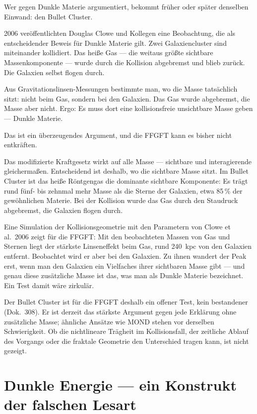 \documentclass[11pt,oneside]{book}
\begin{document}
Wer gegen Dunkle Materie argumentiert, bekommt früher oder
später denselben Einwand: den Bullet Cluster.

2006 veröffentlichten Douglas Clowe und Kollegen eine
Beobachtung, die als entscheidender Beweis für Dunkle Materie
gilt. Zwei Galaxiencluster sind miteinander kollidiert. Das
heiße Gas — die weitaus größte sichtbare Massenkomponente —
wurde durch die Kollision abgebremst und blieb zurück. Die
Galaxien selbst flogen durch.

Aus Gravitationslinsen-Messungen bestimmte man, wo die
Masse tatsächlich sitzt: nicht beim Gas, sondern bei den
Galaxien. Das Gas wurde abgebremst, die Masse aber nicht.
Ergo: Es muss dort eine kollisionsfreie unsichtbare Masse
geben — Dunkle Materie.

Das ist ein überzeugendes Argument, und die FFGFT kann es
bisher nicht entkräften.

Das modifizierte Kraftgesetz wirkt auf alle Masse — sichtbare
und interagierende gleichermaßen. Entscheidend ist deshalb, wo
die sichtbare Masse sitzt. Im Bullet Cluster ist das heiße
Röntgengas die dominante sichtbare Komponente: Es trägt rund
fünf- bis zehnmal mehr Masse als die Sterne der Galaxien, etwa
85\,\% der gewöhnlichen Materie. Bei der Kollision wurde das Gas
durch den Staudruck abgebremst, die Galaxien flogen durch.

Eine Simulation der Kollisionsgeometrie mit den Parametern von
Clowe et al.\ 2006 zeigt für die FFGFT: Mit den beobachteten
Massen von Gas und Sternen liegt der stärkste Linseneffekt beim
Gas, rund 240~kpc von den Galaxien entfernt. Beobachtet wird er
aber bei den Galaxien. Zu ihnen wandert der Peak erst, wenn man
den Galaxien ein Vielfaches ihrer sichtbaren Masse gibt — und
genau diese zusätzliche Masse ist das, was man als Dunkle
Materie bezeichnet. Ein Test damit wäre zirkulär.

Der Bullet Cluster ist für die FFGFT deshalb ein offener Test,
kein bestandener (Dok.~308). Er ist derzeit das stärkste
Argument gegen jede Erklärung ohne zusätzliche Masse; ähnliche
Ansätze wie MOND stehen vor derselben Schwierigkeit. Ob die
nichtlineare Trägheit im Kollisionsfall, der zeitliche Ablauf
des Vorgangs oder die fraktale Geometrie den Unterschied
tragen kann, ist nicht gezeigt.

\chapter{Dunkle Energie — ein Konstrukt der falschen Lesart}
\end{document}
